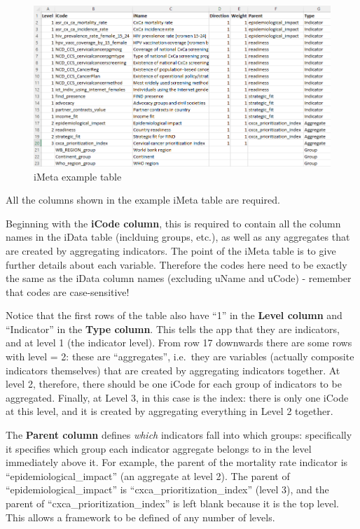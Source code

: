 \documentclass[
  letterpaper,
  DIV=11,
  numbers=noendperiod]{scrreprt}
\begin{document}
\begin{figure}

{\centering \includegraphics[width=1\textwidth,height=\textheight]{figs/data_input_3.png}

}

\caption{iMeta example table}

\end{figure}

All the columns shown in the example iMeta table are required.

Beginning with the \textbf{iCode column}, this is required to contain
all the column names in the iData table (inclduing groups, etc.), as
well as any aggregates that are created by aggregating indicators. The
point of the iMeta table is to give further details about each variable.
Therefore the codes here need to be exactly the same as the iData column
names (excluding uName and uCode) - remember that codes are
case-sensitive!

Notice that the first rows of the table also have ``1'' in the
\textbf{Level column} and ``Indicator'' in the \textbf{Type column}.
This tells the app that they are indicators, and at level 1 (the
indicator level). From row 17 downwards there are some rows with level =
2: these are ``aggregates'', i.e.~they are variables (actually composite
indicators themselves) that are created by aggregating indicators
together. At level 2, therefore, there should be one iCode for each
group of indicators to be aggregated. Finally, at Level 3, in this case
is the index: there is only one iCode at this level, and it is created
by aggregating everything in Level 2 together.

The \textbf{Parent column} defines \emph{which} indicators fall into
which groups: specifically it specifies which group each indicator
aggregate belongs to in the level immediately above it. For example, the
parent of the mortality rate indicator is ``epidemiological\_impact''
(an aggregate at level 2). The parent of ``epidemiological\_impact'' is
``cxca\_prioritization\_index'' (level 3), and the parent of
``cxca\_prioritization\_index'' is left blank because it is the top
level. This allows a framework to be defined of any number of levels.
\end{document}
